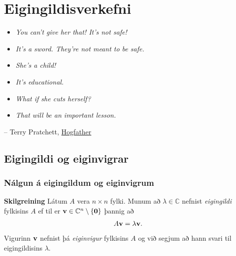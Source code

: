 \documentclass[letterpaper,10pt,icelandic]{sphinxmanual}
\begin{document}
\chapter{Eigingildisverkefni}
\label{kafli09::doc}\label{kafli09:eigingildisverkefni}\begin{itemize}
\item {} 
\emph{You can't give her that! It's not safe!}

\item {} 
\emph{It's a sword. They're not meant to be safe.}

\item {} 
\emph{She's a child!}

\item {} 
\emph{It's educational.}

\item {} 
\emph{What if she cuts herself?}

\item {} 
\emph{That will be an important lesson.}

\end{itemize}

-- Terry Pratchett, \href{http://adi-fitri.tumblr.com/post/105355206099/its-a-sword-its-not-meant-to-be-safe-my}{Hogfather}


\section{Eigingildi og eiginvigrar}
\label{kafli09:index-0}\label{kafli09:eigingildi-og-eiginvigrar}

\subsection{Nálgun á eigingildum og eiginvigrum}
\label{kafli09:nalgun-a-eigingildum-og-eiginvigrum}
\textbf{Skilgreining} Látum \(A\) vera \(n\times n\) fylki. Munum að
\(\lambda\in {{\mathbb  C}}\) nefnist \emph{eigingildi} fylkisins
\(A\) ef til er
\({\mbox{${\bf v}$}}\in {{\mathbb  C}}^n\setminus\{{\mbox{${\bf 0}$}}\}\)
þannig að
\begin{gather}
\begin{split}A{\mbox{${\bf v}$}}=\lambda{\mbox{${\bf v}$}}.\end{split}\notag
\end{gather}
Vigurinn \({\mbox{${\bf v}$}}\) nefnist þá \emph{eiginvigur} fylkisins
\(A\) og við segjum að hann svari til eigingildisins
\(\lambda\).
\end{document}
